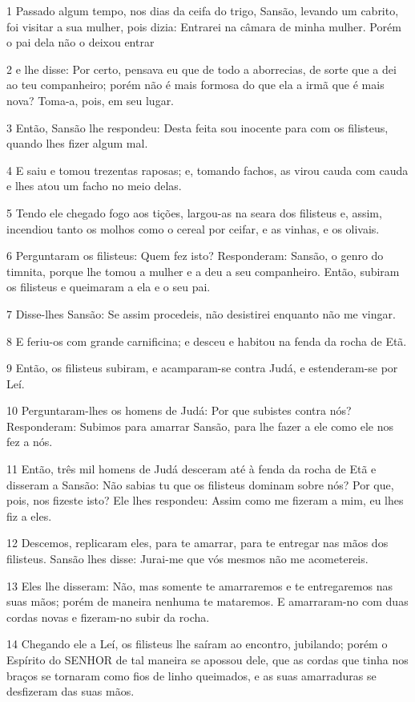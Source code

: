 \par 1 Passado algum tempo, nos dias da ceifa do trigo, Sansão, levando um cabrito, foi visitar a sua mulher, pois dizia: Entrarei na câmara de minha mulher. Porém o pai dela não o deixou entrar
\par 2 e lhe disse: Por certo, pensava eu que de todo a aborrecias, de sorte que a dei ao teu companheiro; porém não é mais formosa do que ela a irmã que é mais nova? Toma-a, pois, em seu lugar.
\par 3 Então, Sansão lhe respondeu: Desta feita sou inocente para com os filisteus, quando lhes fizer algum mal.
\par 4 E saiu e tomou trezentas raposas; e, tomando fachos, as virou cauda com cauda e lhes atou um facho no meio delas.
\par 5 Tendo ele chegado fogo aos tições, largou-as na seara dos filisteus e, assim, incendiou tanto os molhos como o cereal por ceifar, e as vinhas, e os olivais.
\par 6 Perguntaram os filisteus: Quem fez isto? Responderam: Sansão, o genro do timnita, porque lhe tomou a mulher e a deu a seu companheiro. Então, subiram os filisteus e queimaram a ela e o seu pai.
\par 7 Disse-lhes Sansão: Se assim procedeis, não desistirei enquanto não me vingar.
\par 8 E feriu-os com grande carnificina; e desceu e habitou na fenda da rocha de Etã.
\par 9 Então, os filisteus subiram, e acamparam-se contra Judá, e estenderam-se por Leí.
\par 10 Perguntaram-lhes os homens de Judá: Por que subistes contra nós? Responderam: Subimos para amarrar Sansão, para lhe fazer a ele como ele nos fez a nós.
\par 11 Então, três mil homens de Judá desceram até à fenda da rocha de Etã e disseram a Sansão: Não sabias tu que os filisteus dominam sobre nós? Por que, pois, nos fizeste isto? Ele lhes respondeu: Assim como me fizeram a mim, eu lhes fiz a eles.
\par 12 Descemos, replicaram eles, para te amarrar, para te entregar nas mãos dos filisteus. Sansão lhes disse: Jurai-me que vós mesmos não me acometereis.
\par 13 Eles lhe disseram: Não, mas somente te amarraremos e te entregaremos nas suas mãos; porém de maneira nenhuma te mataremos. E amarraram-no com duas cordas novas e fizeram-no subir da rocha.
\par 14 Chegando ele a Leí, os filisteus lhe saíram ao encontro, jubilando; porém o Espírito do SENHOR de tal maneira se apossou dele, que as cordas que tinha nos braços se tornaram como fios de linho queimados, e as suas amarraduras se desfizeram das suas mãos.
